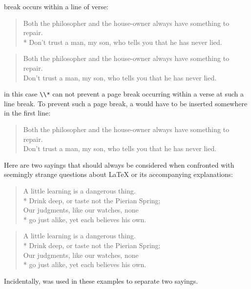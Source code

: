 \begin{Example}
      break occurs within a line of verse:
\begin{lstcode}
  \begin{verse}
    Both the philosopher and the house-owner
    always have something to repair.\\*
    \bigskip
    Don't trust a man, my son, who tells you
    that he has never lied.
  \end{verse}
\end{lstcode}
      \begin{ShowOutput}
        \begin{verse}
    	  Both the philosopher and the house-owner always have something to
          repair.\\
          \bigskip Don't trust a man, my son, who tells you that he has never
          lied.
        \end{verse}
      \end{ShowOutput}
      in this case \verb|\\*| can not prevent a page break occurring within a
      verse at such a line break. To prevent such a page break, a
       would have to be inserted
      somewhere in the first line:
\begin{lstcode}
  \begin{verse}
    Both the philosopher and the house-owner\nopagebreak{}
    always have something to repair.\\
    \bigskip
    Don't trust a man, my son, who tells you\nopagebreak{}
    that he has never lied.
  \end{verse}
\end{lstcode}
      \iftrue%
        Here are two sayings that should always be considered when confronted
        with seemingly strange questions about {\LaTeX} or its accompanying
        explanations:
\begin{lstcode}
  \begin{verse}
    A little learning is a dangerous thing.\\*
    Drink deep, or taste not the Pierian Spring;\\
    \bigskip
    Our judgments, like our watches, none\\*
    go just alike, yet each believes his own.
  \end{verse}
\end{lstcode}
        \begin{ShowOutput}
          \begin{verse}
            A little learning is a dangerous thing.\\*
            Drink deep, or taste not the Pierian Spring;\\
            \bigskip
            Our judgments, like our watches, none\\*
            go just alike, yet each believes his own.
          \end{verse}
        \end{ShowOutput}
      \fi
      Incidentally,  was used in these examples to separate two
      sayings.
    \end{Example}
  \fi
  \EndIndexGroup


